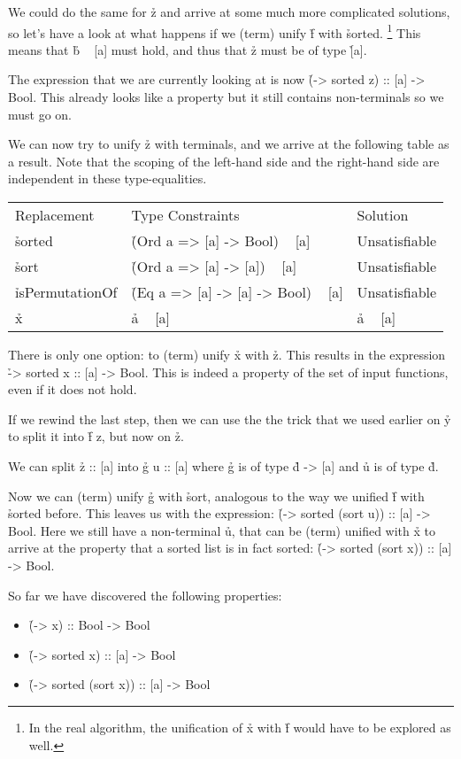 \documentclass[a4paper, 11pt]{article}
\begin{document}
We could do the same for \h{z} and arrive at some much more complicated solutions, so let's have a look at what happens if we (term) unify \h{f} with \h{sorted}. \footnote{In the real algorithm, the unification of \h{x} with \h{f} would have to be explored as well.}
This means that \h{b ~ [a]} must hold, and thus that \h{z} must be of type \h{[a]}.

The expression that we are currently looking at is now \h{(\a -> sorted z) :: [a] -> Bool}.
This already looks like a property but it still contains non-terminals so we must go on.

We can now try to unify \h{z} with terminals, and we arrive at the following table as a result.
Note that the scoping of the left-hand side and the right-hand side are independent in these type-equalities.

\begin{tabular}{lll}
  Replacement & Type Constraints & Solution \\
  \h{sorted} & \h{(Ord a => [a] -> Bool) ~ [a]} & Unsatisfiable \\
  \h{sort} & \h{(Ord a => [a] -> [a]) ~ [a]} & Unsatisfiable \\
  \h{isPermutationOf} & \h{(Eq a => [a] -> [a] -> Bool) ~ [a]} & Unsatisfiable \\
  \h{x} & \h{a ~ [a]} & \h{a ~ [a]} \\
\end{tabular}

There is only one option: to (term) unify \h{x} with \h{z}.
This results in the expression \h{\a -> sorted x :: [a] -> Bool}.
This is indeed a property of the set of input functions, even if it does not hold.

If we rewind the last step, then we can use the the trick that we used earlier on \h{y} to split it into \h{f z}, but now on \h{z}.

We can split \h{z :: [a]} into \h{g u :: [a]} where \h{g} is of type \h{d -> [a]} and \h{u} is of type \h{d}.

Now we can (term) unify \h{g} with \h{sort}, analogous to the way we unified \h{f} with \h{sorted} before.
This leaves us with the expression: \h{(\a -> sorted (sort u)) :: [a] -> Bool}.
Here we still have a non-terminal \h{u}, that can be (term) unified with \h{x} to arrive at the property that a sorted list is in fact sorted:
\h{(\x -> sorted (sort x)) :: [a] -> Bool}.

So far we have discovered the following properties:

\begin{itemize}
  \item \h{(\x -> x) :: Bool -> Bool}
  \item \h{(\x -> sorted x) :: [a] -> Bool}
  \item \h{(\x -> sorted (sort x)) :: [a] -> Bool}
\end{itemize}
\end{document}
